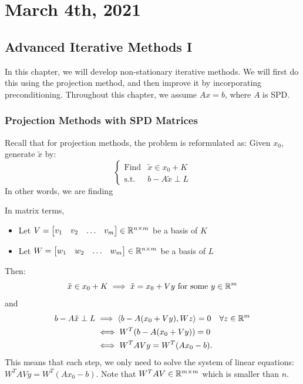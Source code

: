 \documentclass[../main/main.tex]{subfiles}
\begin{document}
\section{March 4th, 2021}
\subsection{Advanced Iterative Methods I}
In this chapter, we will develop non-stationary iterative methods. We will first do this using the projection method, and then improve it by incorporating preconditioning. Throughout this chapter, we assume $Ax=b$, where $A$ is SPD.
\subsubsection{Projection Methods with SPD Matrices}
Recall that for projection methods, the problem is reformulated as: Given $x_{0}$, generate $\tilde{x}$ by: \[
\begin{cases}
  \text{Find} &\tilde{x} \in  x_{0} +K \\
  \text{s.t.} & b - A\tilde{x} \perp L
\end{cases}
\]
In other words, we are finding

In matrix terms,
\begin{itemize}
\item Let $V = \begin{bmatrix}
v_1 & v_2 & \ldots  & v_{m}
\end{bmatrix} \in \mathbb{R} ^{n\times m}$ be a basis of $K$
\item Let $W = \begin{bmatrix}
w_1 & w_2 & \ldots  & w_{m}
\end{bmatrix} \in \mathbb{R} ^{n\times m}$ be a basis of $L$
\end{itemize}
Then: \[
\tilde{x} \in  x_{0} + K \implies  \tilde{x} = x_{0} + Vy \text{ for some $y\in \mathbb{R} ^{m}$}
\] and\[
\]
\begin{align*}
  b-A\tilde{x} \perp L &\implies  \langle b-A(x_{0}+Vy), Wz\rangle = 0 \quad\forall z \in \mathbb{R} ^{m}\\
                       &\iff  W^{T}(b-A(x_{0}+Vy)) = 0\\
  &\iff W^{T}AV y = W^{T}(Ax_{0}-b)
  .\end{align*}
This means that each step, we only need to solve the system of linear equations: $W^{T}AV y = W^{T}(Ax_{0}-b)$. Note that $W^{T}AV\in \mathbb{R} ^{m\times m}$ which is smaller than $n$. \\
\end{document}
